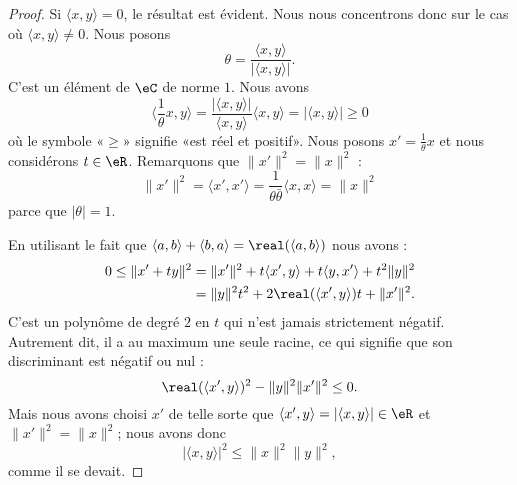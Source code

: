 \begin{proof}
    Si \( \langle x, y\rangle =0\), le résultat est évident. Nous nous concentrons donc sur le cas où \( \langle x, y\rangle \neq0\). Nous posons
    \begin{equation}
        \theta=\frac{ \langle x, y\rangle  }{ | \langle x, y\rangle  | }.
    \end{equation}
    C'est un élément de \( \eC\) de norme \( 1\). Nous avons
    \begin{equation}
        \langle \frac{1}{ \theta }x, y\rangle =\frac{ | \langle x, y\rangle  | }{ \langle x, y\rangle  }\langle x, y\rangle =| \langle x, y\rangle  |\geq 0
    \end{equation}
    où le symbole «\( \geq\)» signifie «est réel et positif». Nous posons \( x'=\frac{1}{ \theta }x\) et nous considérons \( t\in \eR\). Remarquons que \( \| x' \|^2=\| x \|^2\) :
    \begin{equation}
        \| x' \|^2=\langle x', x'\rangle =\frac{1}{ \theta\bar\theta }\langle x, x\rangle =\| x \|^2
    \end{equation}
    parce que \( | \theta |=1\).

    En utilisant le fait que \( \langle a, b\rangle +\langle b, a\rangle =\real(\langle a, b\rangle )\) nous avons :
    \begin{subequations}
        \begin{align}
            0\leq \| x'+ty \|^2&=\| x' \|^2+t\langle x', y\rangle +t\langle y, x'\rangle +t^2\| y \|^2\\
            &=\| y \|^2t^2+2\real(\langle x', y\rangle )t+\| x' \|^2.
        \end{align}
    \end{subequations}
    C'est un polynôme de degré \( 2\) en \( t\) qui n'est jamais strictement négatif. Autrement dit, il a au maximum une seule racine, ce qui signifie que son discriminant est négatif ou nul :
    \begin{equation}
        \real(\langle x', y\rangle )^2-\| y \|^2\| x' \|^2\leq 0.
    \end{equation}
    Mais nous avons choisi \( x'\) de telle sorte que \( \langle x', y\rangle =| \langle x, y\rangle  |\in \eR\) et \( \| x' \|^2=\| x \|^2\); nous avons donc
    \begin{equation}
        | \langle x, y\rangle  |^2\leq \| x \|^2\| y \|^2,
    \end{equation}
    comme il se devait.
\end{proof}

